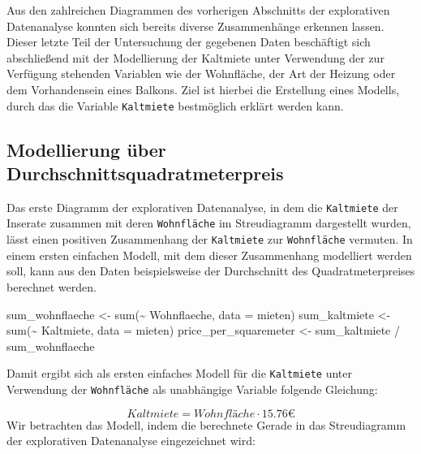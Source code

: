 \documentclass[
  a4paper,
  DIV=11]{scrartcl}
\newenvironment{Shaded}{\begin{snugshade}}{\end{snugshade}}
\newcommand{\AttributeTok}[1]{\textcolor[rgb]{0.40,0.45,0.13}{#1}}
\newcommand{\FunctionTok}[1]{\textcolor[rgb]{0.28,0.35,0.67}{#1}}
\newcommand{\NormalTok}[1]{\textcolor[rgb]{0.00,0.23,0.31}{#1}}
\newcommand{\OtherTok}[1]{\textcolor[rgb]{0.00,0.23,0.31}{#1}}
\newcommand{\SpecialCharTok}[1]{\textcolor[rgb]{0.37,0.37,0.37}{#1}}
\begin{document}
Aus den zahlreichen Diagrammen des vorherigen Abschnitts der
explorativen Datenanalyse konnten sich bereits diverse Zusammenhänge
erkennen lassen. Dieser letzte Teil der Untersuchung der gegebenen Daten
beschäftigt sich abschließend mit der Modellierung der Kaltmiete unter
Verwendung der zur Verfügung stehenden Variablen wie der Wohnfläche, der
Art der Heizung oder dem Vorhandensein eines Balkons. Ziel ist hierbei
die Erstellung eines Modells, durch das die Variable \texttt{Kaltmiete}
bestmöglich erklärt werden kann.

\hypertarget{modellierung-uxfcber-durchschnittsquadratmeterpreis}{%
\subsection{Modellierung über
Durchschnittsquadratmeterpreis}\label{modellierung-uxfcber-durchschnittsquadratmeterpreis}}

Das erste Diagramm der explorativen Datenanalyse, in dem die
\texttt{Kaltmiete} der Inserate zusammen mit deren \texttt{Wohnfläche}
im Streudiagramm dargestellt wurden, lässt einen positiven Zusammenhang
der \texttt{Kaltmiete} zur \texttt{Wohnfläche} vermuten. In einem ersten
einfachen Modell, mit dem dieser Zusammenhang modelliert werden soll,
kann aus den Daten beispielsweise der Durchschnitt des
Quadratmeterpreises berechnet werden.

\begin{Shaded}
\begin{Highlighting}[]
\NormalTok{sum\_wohnflaeche }\OtherTok{\textless{}{-}} \FunctionTok{sum}\NormalTok{(}\SpecialCharTok{\textasciitilde{}}\NormalTok{ Wohnflaeche, }\AttributeTok{data =}\NormalTok{ mieten)}
\NormalTok{sum\_kaltmiete }\OtherTok{\textless{}{-}} \FunctionTok{sum}\NormalTok{(}\SpecialCharTok{\textasciitilde{}}\NormalTok{ Kaltmiete, }\AttributeTok{data =}\NormalTok{ mieten)}
\NormalTok{price\_per\_squaremeter }\OtherTok{\textless{}{-}}\NormalTok{ sum\_kaltmiete }\SpecialCharTok{/}\NormalTok{ sum\_wohnflaeche}
\end{Highlighting}
\end{Shaded}

Damit ergibt sich als ersten einfaches Modell für die \texttt{Kaltmiete}
unter Verwendung der \texttt{Wohnfläche} als unabhängige Variable
folgende Gleichung:

\[ Kaltmiete = Wohnfläche \cdot 15.76 € \] Wir betrachten das Modell,
indem die berechnete Gerade in das Streudiagramm der explorativen
Datenanalyse eingezeichnet wird:
\end{document}
